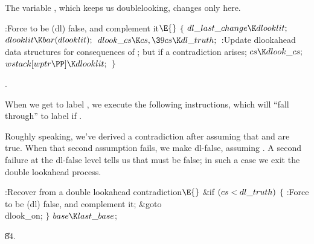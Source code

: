 The variable , which keeps us
doublelooking,
changes only here.

\Y\B\4:Force  to be (dl) false, and complement it\X${}%
\E{}$\6
${}\{{}$\1\6
${}\\{dl\_last\_change}\K\\{dlooklit};{}$\6
${}\\{dlooklit}\K\\{bar}(\\{dlooklit});{}$\6
${}\\{dlook\_cs}\K\\{cs},\39\\{cs}\K\\{dl\_truth};{}$\6
:Update dlookahead data structures for consequences of ;
but  if a contradiction arises\X;\6
${}\\{cs}\K\\{dlook\_cs};{}$\6
${}\\{wstack}[\\{wptr}\PP]\K\\{dlooklit};{}$\6
\4${}\}{}$\2\par
{}.\fi

When we get to label , we execute the
following
instructions, which will ``fall through'' to label  if
.

Roughly speaking, we've derived a contradiction after assuming
that  and  are true. When that second
assumption fails, we
make  dl-false, assuming .
A second failure at the dl-false level
tells us that  must be false; in such a case we exit
the double lookahead process.

\Y\B\4:Recover from a double lookahead contradiction\X${}\E{}$\6
\&{if} ${}(\\{cs}<\\{dl\_truth}){}$\5
${}\{{}$\1\6
:Force  to be (dl) false, and complement it\X;\6
\&{goto} \\{dlook\_on};\6
\4${}\}{}$\2\6
${}\\{base}\K\\{last\_base}{}$;\par
\U84.\fi

